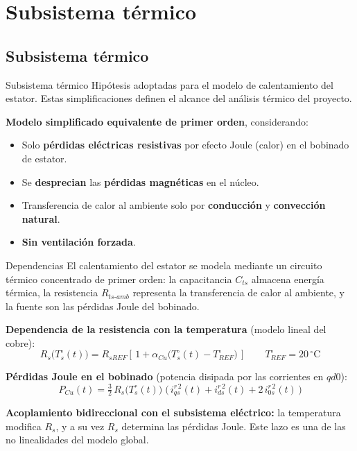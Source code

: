 \documentclass[aspectratio=169,t]{beamer}
\newcommand{\SecPresentacion}{Presentación del problema}
\newcommand{\SecMecanico}{Subsistema mecánico equivalente}
\newcommand{\SecElectromagnetico}{Subsistema electromagnético en coordenadas qd0}
\newcommand{\SecTermico}{Subsistema térmico}
\newcommand{\SecNLGlobal}{Sistema No Lineal Global}
\newcommand{\SecLPV}{Linealización Jacobiana (LPV)}
\newcommand{\SecLTI}{Obtención del modelo LTI equivalente}
\newcommand{\SecAnalisisLTI}{Análisis del modelo LTI aumentado}
\newcommand{\SecDinamica}{Respuesta dinámica en dominio del tiempo}
\newcommand{\SecControlador}{Diseño y análisis del controlador en cascada}
\newcommand{\SecVerifSpecs}{Verificación de desempeño: Especificaciones de operación}
\newcommand{\SecVerifOffset}{Verificación de desempeño: Offset de estado estacionario}
\newcommand{\SecVerifNoIdealidades}{Verificación de desempeño: No idealidades y comportamiento térmico}
\newcommand{\SecDiscretizacion}{Discretización del controlador}
\newcommand{\SecSoftware}{Codificación del software de control}
\newcommand{\AgendaItem}[3]{%
  \ifnum#1=#2
    {\scriptsize\bfseries\color{uncBlue}%
      \hyperlink{sec:#1}{\makebox[2.2em][r]{#1.}\hspace{0.7em}%
      \parbox[t]{0.86\textwidth}{#3}}\par}%
  \else
    {\scriptsize\color{black!26}%
      \hyperlink{sec:#1}{\makebox[2.2em][r]{#1.}\hspace{0.7em}%
      \parbox[t]{0.86\textwidth}{#3}}\par}%
  \fi
  \vspace{0.35mm}%
}
\newcommand{\AgendaBody}[1]{%
    \vspace{3mm}
    {\Large\bfseries\color{uncBlue}Tabla de contenidos\par}
    \vspace{2mm}
    \begin{minipage}{0.94\textwidth}
      \AgendaItem{1}{#1}{\SecPresentacion}
      \AgendaItem{2}{#1}{\SecMecanico}
      \AgendaItem{3}{#1}{\SecElectromagnetico}
      \AgendaItem{4}{#1}{\SecTermico}
      \AgendaItem{5}{#1}\SecNLGlobal
      \AgendaItem{6}{#1}{\SecLPV}
      \AgendaItem{7}{#1}{\SecLTI}
      \AgendaItem{8}{#1}{\SecAnalisisLTI}
      \AgendaItem{9}{#1}{\SecDinamica}
      \AgendaItem{10}{#1}{\SecControlador}
      \AgendaItem{11}{#1}{\SecVerifSpecs}
      \AgendaItem{12}{#1}{\SecVerifOffset}
      \AgendaItem{13}{#1}{\SecVerifNoIdealidades}
      \AgendaItem{14}{#1}{\SecDiscretizacion}
      \AgendaItem{15}{#1}{\SecSoftware}
    \end{minipage}
    \vfill
}
\newcommand{\AgendaSlideTarget}[2]{%
  \begin{frame}[plain]
    \hypertarget{#2}{}%
    \AgendaBody{#1}
  \end{frame}
}
\newcommand{\StartProjectSection}[2]{%
  \section{#2}%
  \subsection{#2}%
  \AgendaSlideTarget{#1}{sec:#1}%
}
\begin{document}
\StartProjectSection{4}{\SecTermico}
\begin{frame}{Subsistema térmico}
{\small\color{uncGray}Hipótesis adoptadas para el modelo de calentamiento del estator. Estas simplificaciones definen el alcance del análisis térmico del proyecto.}\par
\vspace{6mm}

\textbf{Modelo simplificado equivalente de primer orden}, considerando:
\begin{itemize}
\item Solo \textbf{pérdidas eléctricas resistivas} por efecto Joule (calor) en el bobinado de estator.
\item Se \textbf{desprecian} las \textbf{pérdidas magnéticas} en el núcleo.
\item Transferencia de calor al ambiente solo por \textbf{conducción} y \textbf{convección natural}.
\item \textbf{Sin ventilación forzada}.
\end{itemize}
\end{frame}

\begin{frame}{Dependencias}
{\small\color{uncGray}El calentamiento del estator se modela mediante un circuito térmico concentrado de primer orden: la capacitancia $C_{ts}$ almacena energía térmica, la resistencia $R_{ts\text{-}amb}$ representa la transferencia de calor al ambiente, y la fuente son las pérdidas Joule del bobinado.}\par
\vspace{4mm}

\textbf{Dependencia de la resistencia con la temperatura} (modelo lineal del cobre):
\begin{equation*}
R_s\!\big(T_s^\circ(t)\big) = R_{sREF}\!\left[\,1 + \alpha_{Cu}\!\big(T_s^\circ(t) - T_{REF}^\circ\big)\,\right]
\qquad T_{REF}^\circ = 20\,^\circ\text{C}
\end{equation*}

\textbf{Pérdidas Joule en el bobinado} (potencia disipada por las corrientes en $qd0$):
\begin{equation*}
P_{Cu}(t) = \tfrac{3}{2}\,R_s\!\big(T_s^\circ(t)\big)\;\big(\,i_{qs}^{r\,2}(t) + i_{ds}^{r\,2}(t) + 2\,i_{0s}^{r\,2}(t)\,\big)
\end{equation*}

\vspace{2mm}
{\small \textbf{Acoplamiento bidireccional con el subsistema eléctrico:} la temperatura modifica $R_s$, y a su vez $R_s$ determina las pérdidas Joule. Este lazo es una de las no linealidades del modelo global.}
\end{frame}
\end{document}
